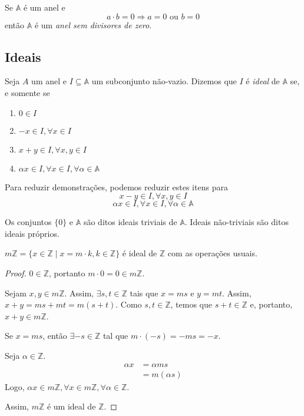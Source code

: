 \begin{df}
Se $\mathbb{A}$ é um anel e \[a\cdot b = 0 \Rightarrow a=0 \textrm{ ou }b=0\] então $\mathbb{A}$ é um \emph{anel sem divisores de zero}.
\end{df}

\subsection{Ideais}

\begin{df}
Seja $A$ um anel e $I \subseteq \mathbb{A}$ um subconjunto não-vazio. Dizemos que $I$ é \emph{ideal} de $\mathbb{A}$ se, e somente se
\begin{enumerate}
\item $0\in I$
\item $-x \in I, \forall x \in I$
\item $x+y \in I, \forall x,y \in I$
\item $\alpha x \in I, \forall x \in I, \forall \alpha \in \mathbb{A}$
\end{enumerate}
Para reduzir demonstrações, podemos reduzir estes itens para \[x-y \in I, \forall x,y \in I\]\[\alpha x \in I, \forall x \in I, \forall \alpha \in \mathbb{A}\]
\end{df}

Os conjuntos $\{ 0\}$ e $\mathbb{A}$ são ditos ideais triviais de $\mathbb{A}$. Ideais não-triviais são ditos ideais próprios.

\begin{exemplo}
$m\mathbb{Z}=\{x \in \mathbb{Z} \mid x=m\cdot k, k \in \mathbb{Z}\}$ é ideal de $\mathbb{Z}$ com as operações usuais. \par \begin{proof}
$0 \in \mathbb{Z}$, portanto $m\cdot 0 = 0 \in m\mathbb{Z}$. \par Sejam $x,y \in m\mathbb{Z}$. Assim, $\exists s,t \in \mathbb{Z}$ tais que $x=ms$ e $y=mt$. Assim, $x+y=ms+mt=m(s+t)$. Como $s,t \in \mathbb{Z}$, temos que $s+t\in \mathbb{Z}$ e, portanto, $x+y \in m\mathbb{Z}$. \par Se $x=ms$, então $\exists -s \in \mathbb{Z}$ tal que $m\cdot(-s)=-ms=-x$. \par Seja $\alpha \in \mathbb{Z}$. \begin{align*}
\alpha x&= \alpha ms \\
&= m(\alpha s)
\end{align*}
Logo, $\alpha x \in m\mathbb{Z}, \forall x \in m\mathbb{Z}, \forall \alpha \in \mathbb{Z}$. \par Assim, $m\mathbb{Z}$ é um ideal de $\mathbb{Z}$.
\end{proof} \end{exemplo}

